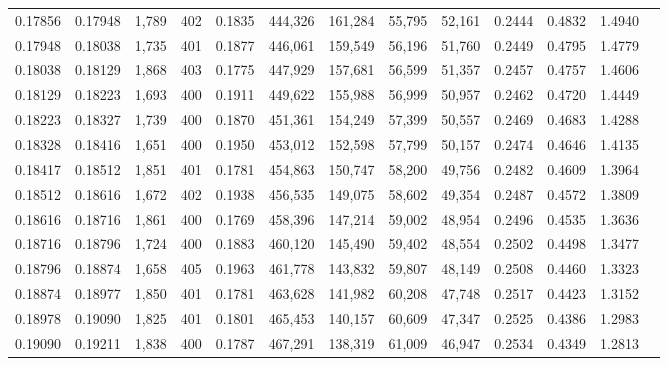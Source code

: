 \begin{tabular}{rrrrrrrrrrrrr}
0.17856 & 0.17948 &  1,789 & 402 &                                     0.1835 & 444,326 & 161,284 &  55,795 &  52,161 & 0.2444 & 0.4832 & 1.4940 \\
0.17948 & 0.18038 &  1,735 & 401 &                                     0.1877 & 446,061 & 159,549 &  56,196 &  51,760 & 0.2449 & 0.4795 & 1.4779 \\
0.18038 & 0.18129 &  1,868 & 403 &                                     0.1775 & 447,929 & 157,681 &  56,599 &  51,357 & 0.2457 & 0.4757 & 1.4606 \\
0.18129 & 0.18223 &  1,693 & 400 &                                     0.1911 & 449,622 & 155,988 &  56,999 &  50,957 & 0.2462 & 0.4720 & 1.4449 \\
0.18223 & 0.18327 &  1,739 & 400 &                                     0.1870 & 451,361 & 154,249 &  57,399 &  50,557 & 0.2469 & 0.4683 & 1.4288 \\
0.18328 & 0.18416 &  1,651 & 400 &                                     0.1950 & 453,012 & 152,598 &  57,799 &  50,157 & 0.2474 & 0.4646 & 1.4135 \\
0.18417 & 0.18512 &  1,851 & 401 &                                     0.1781 & 454,863 & 150,747 &  58,200 &  49,756 & 0.2482 & 0.4609 & 1.3964 \\
0.18512 & 0.18616 &  1,672 & 402 &                                     0.1938 & 456,535 & 149,075 &  58,602 &  49,354 & 0.2487 & 0.4572 & 1.3809 \\
0.18616 & 0.18716 &  1,861 & 400 &                                     0.1769 & 458,396 & 147,214 &  59,002 &  48,954 & 0.2496 & 0.4535 & 1.3636 \\
0.18716 & 0.18796 &  1,724 & 400 &                                     0.1883 & 460,120 & 145,490 &  59,402 &  48,554 & 0.2502 & 0.4498 & 1.3477 \\
0.18796 & 0.18874 &  1,658 & 405 &                                     0.1963 & 461,778 & 143,832 &  59,807 &  48,149 & 0.2508 & 0.4460 & 1.3323 \\
0.18874 & 0.18977 &  1,850 & 401 &                                     0.1781 & 463,628 & 141,982 &  60,208 &  47,748 & 0.2517 & 0.4423 & 1.3152 \\
0.18978 & 0.19090 &  1,825 & 401 &                                     0.1801 & 465,453 & 140,157 &  60,609 &  47,347 & 0.2525 & 0.4386 & 1.2983 \\
0.19090 & 0.19211 &  1,838 & 400 &                                     0.1787 & 467,291 & 138,319 &  61,009 &  46,947 & 0.2534 & 0.4349 & 1.2813 \\

\end{tabular}
